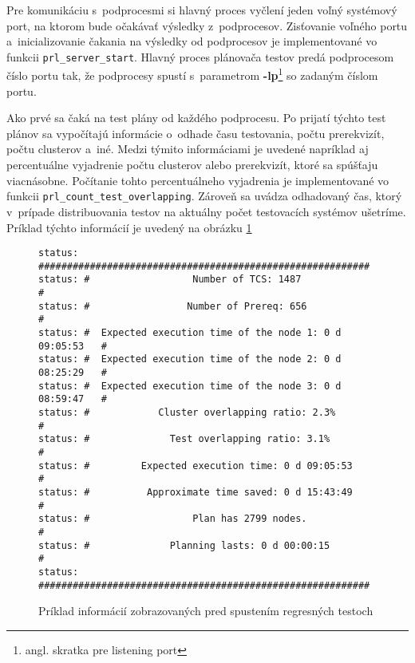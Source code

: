Pre komunikáciu s~podprocesmi si hlavný proces vyčlení jeden voľný 
systémový port, na ktorom bude očakávať výsledky z~podprocesov. 
Zisťovanie voľného portu a~inicializovanie čakania na výsledky od 
podprocesov je implementované vo funkcii \texttt{prl\_server\_start}. 
Hlavný proces plánovača testov predá podprocesom číslo portu tak, že 
podprocesy spustí s~parametrom 
\textbf{-lp}\footnote{angl. skratka pre listening port} so zadaným
číslom portu.

Ako prvé sa čaká na test plány od každého podprocesu. 
Po prijatí týchto test plánov sa vypočítajú informácie
o~odhade času testovania, počtu prerekvizít, počtu clusterov a~iné.
Medzi týmito informáciami je uvedené napríklad aj percentuálne vyjadrenie 
počtu clusterov alebo prerekvizít, ktoré sa spúšťaju viacnásobne. 
Počítanie tohto percentuálneho vyjadrenia 
je implementované vo funkcii \texttt{prl\_count\_test\_overlapping}.
Zároveň sa uvádza odhadovaný čas, ktorý v~prípade distribuovania testov
na aktuálny počet testovacích systémov ušetríme. 
Príklad týchto informácií je uvedený na obrázku 
\ref{obrazok:ukazka_statistiky}

\begin{figure}[h]
\begin{lstlisting}
status: ##########################################################
status: #                  Number of TCS: 1487                   #
status: #                 Number of Prereq: 656                  #
status: #  Expected execution time of the node 1: 0 d 09:05:53   #
status: #  Expected execution time of the node 2: 0 d 08:25:29   #
status: #  Expected execution time of the node 3: 0 d 08:59:47   #
status: #            Cluster overlapping ratio: 2.3%             #
status: #              Test overlapping ratio: 3.1%              #
status: #         Expected execution time: 0 d 09:05:53          #
status: #          Approximate time saved: 0 d 15:43:49          #
status: #                  Plan has 2799 nodes.                  #
status: #              Planning lasts: 0 d 00:00:15              #
status: ##########################################################
\end{lstlisting}
\caption{Príklad informácií zobrazovaných pred spustením regresných testoch}
\label{obrazok:ukazka_statistiky}
\end{figure}

